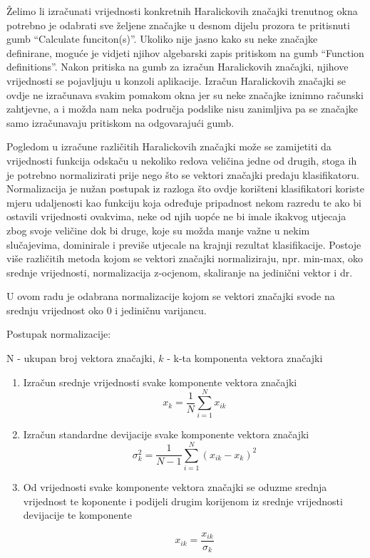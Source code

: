 \documentclass[times, utf8, zavrsni, numeric]{fer}
\begin{document}
\bigbreak

Želimo li izračunati vrijednosti konkretnih Haralickovih značajki 
trenutnog okna potrebno je odabrati sve željene značajke u desnom dijelu
prozora te pritisnuti gumb \enquote{Calculate funciton(s)}. Ukoliko
nije jasno kako su neke značajke definirane, moguće je vidjeti njihov
algebarski zapis pritiskom na gumb \enquote{Function definitions}. 
Nakon pritiska na gumb za izračun Haralickovih značajki, njihove vrijednosti
se pojavljuju u konzoli aplikacije. Izračun Haralickovih značajki se ovdje 
ne izračunava svakim pomakom okna jer su neke značajke iznimno 
računski zahtjevne, a i možda nam neka područja podslike nisu zanimljiva
pa se značajke samo izračunavaju pritiskom na odgovarajući gumb.

\bigbreak

Pogledom u izračune različitih Haralickovih značajki može se zamijetiti da vrijednosti funkcija 
odskaču u nekoliko redova veličina jedne od drugih, stoga ih je potrebno normalizirati
prije nego što se vektori značajki predaju klasifikatoru. Normalizacija
je nužan postupak iz razloga što ovdje korišteni klasifikatori koriste mjeru udaljenosti
kao funkciju koja određuje pripadnost nekom razredu te ako bi ostavili 
vrijednosti ovakvima, neke od njih uopće ne bi imale ikakvog utjecaja zbog 
svoje veličine dok bi druge, koje su možda manje važne u nekim slučajevima,
dominirale i previše utjecale na krajnji rezultat klasifikacije. Postoje više različitih 
metoda kojom se vektori značajki normaliziraju, npr. min-max, oko srednje vrijednosti, 
normalizacija z-ocjenom, skaliranje na jedinični vektor i dr. 

\bigbreak

U ovom radu je odabrana normalizacije kojom se vektori značajki svode na srednju vrijednost oko 0
i jediničnu varijancu.

\newpage

Postupak normalizacije:
\begin{center}

N - ukupan broj vektora značajki, \(k\) - k-ta komponenta vektora značajki

\begin{enumerate}
\item Izračun srednje vrijednosti svake komponente vektora značajki
\[
x_k = \frac{1}{N}\sum_{i=1}^{N}x_{ik}
\]

\item Izračun standardne devijacije svake komponente vektora značajki
\[
\sigma_k^2 = \frac{1}{N-1}\sum_{i=1}^N\left(x_{ik}-x_k\right)^2
\]

\item Od vrijednosti svake komponente vektora značajki se oduzme srednja
vrijednost te koponente i podijeli drugim korijenom iz srednje vrijednosti
devijacije te komponente

\[
x_{ik} = \frac{x_{ik}}{\sigma_k}
\]

\end{enumerate}
\end{center}
\end{document}
